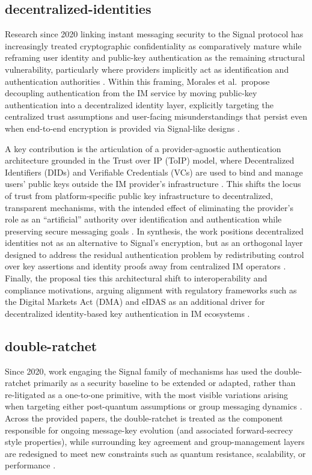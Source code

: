 \subsection{decentralized-identities}
Research since 2020 linking instant messaging security to the Signal protocol has increasingly treated cryptographic confidentiality as comparatively mature while reframing user identity and public-key authentication as the remaining structural vulnerability, particularly where providers implicitly act as identification and authentication authorities \cite{morales2024}. Within this framing, Morales et al.\ propose decoupling authentication from the IM service by moving public-key authentication into a decentralized identity layer, explicitly targeting the centralized trust assumptions and user-facing misunderstandings that persist even when end-to-end encryption is provided via Signal-like designs \cite{morales2024}.

A key contribution is the articulation of a provider-agnostic authentication architecture grounded in the Trust over IP (ToIP) model, where Decentralized Identifiers (DIDs) and Verifiable Credentials (VCs) are used to bind and manage users' public keys outside the IM provider’s infrastructure \cite{morales2024}. This shifts the locus of trust from platform-specific public key infrastructure to decentralized, transparent mechanisms, with the intended effect of eliminating the provider’s role as an ``artificial'' authority over identification and authentication while preserving secure messaging goals \cite{morales2024}. In synthesis, the work positions decentralized identities not as an alternative to Signal’s encryption, but as an orthogonal layer designed to address the residual authentication problem by redistributing control over key assertions and identity proofs away from centralized IM operators \cite{morales2024}. Finally, the proposal ties this architectural shift to interoperability and compliance motivations, arguing alignment with regulatory frameworks such as the Digital Markets Act (DMA) and eIDAS as an additional driver for decentralized identity-based key authentication in IM ecosystems \cite{morales2024}.

\subsection{double-ratchet}
Since 2020, work engaging the Signal family of mechanisms has used the double-ratchet primarily as a security baseline to be extended or adapted, rather than re-litigated as a one-to-one primitive, with the most visible variations arising when targeting either post-quantum assumptions or group messaging dynamics \cite{bobrysheva2021,ayed2025,m2024}. Across the provided papers, the double-ratchet is treated as the component responsible for ongoing message-key evolution (and associated forward-secrecy style properties), while surrounding key agreement and group-management layers are redesigned to meet new constraints such as quantum resistance, scalability, or performance \cite{bobrysheva2021,ayed2025,m2024}.

